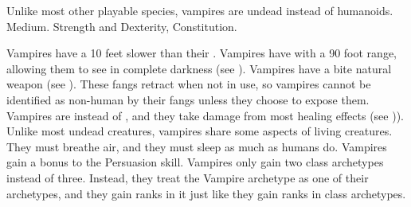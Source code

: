    Unlike most other playable species, vampires are undead instead of humanoids.
   Medium.
    Strength and Dexterity,  Constitution.
  \begin{itemize}
     Vampires have a  10 feet slower than their .
     Vampires have  with a 90 foot range, allowing them to see in complete darkness (see ).
     Vampires have a bite natural weapon (see ).
      These fangs retract when not in use, so vampires cannot be identified as non-human by their fangs unless they choose to expose them.
     Vampires are  instead of , and they take damage from most healing effects (see )).
     Unlike most undead creatures, vampires share some aspects of living creatures.
      They must breathe air, and they must sleep as much as humans do.
     Vampires gain a  bonus to the Persuasion skill.
     Vampires only gain two class archetypes instead of three.
      Instead, they treat the Vampire archetype as one of their archetypes, and they gain ranks in it just like they gain ranks in class archetypes.
  \end{itemize}


